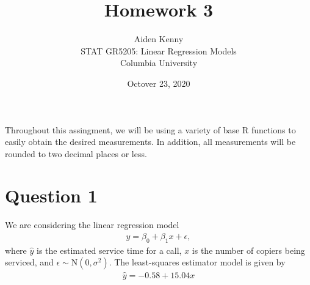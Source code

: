 \documentclass[10pt]{article}
\title{
    {\Large Homework 3}
}
\author{
    {\normalsize Aiden Kenny}\\
    {\normalsize STAT GR5205: Linear Regression Models}\\
    {\normalsize Columbia University}
}
\date{\normalsize Octover 23, 2020}
\begin{document}
\maketitle

\noindent
Throughout this assingment, we will be using a variety of base R functions to easily obtain the desired measurements. In addition, all measurements
will be rounded to two decimal places or less. 

\section{Question 1} \noindent
We are considering the linear regression model 
\begin{align*}
    y = \beta_0 + \beta_1 x + \epsilon,
\end{align*}
where \(\hat{y}\) is the estimated service time for a call, \(x\) is the number of copiers being serviced,
and \(\epsilon \sim \mathrm{N}(0,\sigma^2)\). 
The least-squares estimator model is given by 
\begin{align}
    \hat{y} = -0.58 + 15.04x \label{copier-lm}
\end{align}
\end{document}
